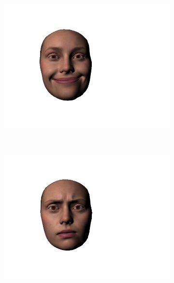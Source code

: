 \begin{figure}[htbp!]
        \centering
        \begin{subfigure}[b]{0.23\textwidth}
                \includegraphics[trim = 50mm 30mm 80mm 30mm,clip,width=\textwidth]{img/weights/3D/Extrafaces/lipcorners15.png}
        \end{subfigure}
        ~ %
        \begin{subfigure}[b]{0.23\textwidth}
                \includegraphics[trim = 50mm 30mm 80mm 30mm,clip,width=\textwidth]{img/weights/3D/Extrafaces/eyebrowsin2.png}
        \end{subfigure} 

\end{figure}
